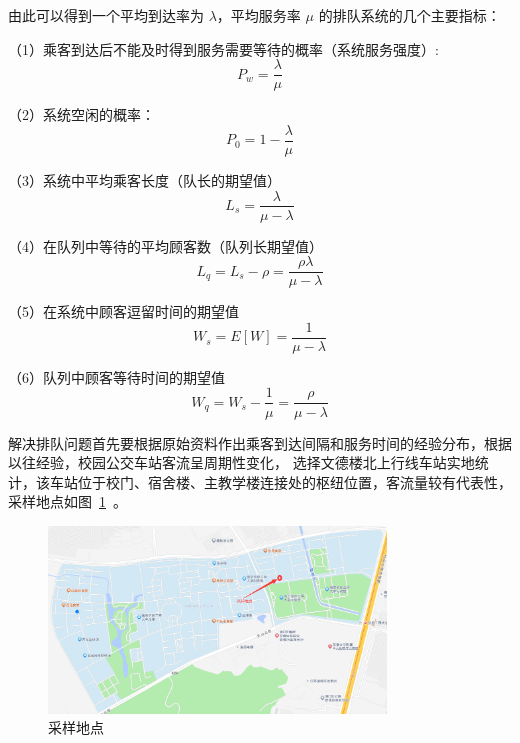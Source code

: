 由此可以得到一个平均到达率为 $\lambda$，平均服务率 $\mu$ 的排队系统的几个主要指标：

（1）乘客到达后不能及时得到服务需要等待的概率（系统服务强度）:
$$P_w = \frac{\lambda}{\mu}$$

（2）系统空闲的概率：
$$P_0 = 1-\frac{\lambda}{\mu}$$

（3）系统中平均乘客长度（队长的期望值）
$$L_s = \frac{\lambda}{\mu - \lambda}$$

（4）在队列中等待的平均顾客数（队列长期望值）
$$L_q = L_s - \rho = \frac{\rho \lambda}{\mu - \lambda}$$

（5）在系统中顾客逗留时间的期望值
$$W_s = E[W] = \frac{1}{\mu - \lambda}$$

（6）队列中顾客等待时间的期望值
$$W_q = W_s - \frac{1}{\mu} = \frac{\rho}{\mu - \lambda}$$


解决排队问题首先要根据原始资料作出乘客到达间隔和服务时间的经验分布，根据以往经验，校园公交车站客流呈周期性变化，
选择文德楼北上行线车站实地统计，该车站位于校门、宿舍楼、主教学楼连接处的枢纽位置，客流量较有代表性，采样地点如图~\ref{fig31}~。
\begin{figure}[htbp!]
    \centering
    \includegraphics[width=0.80\textwidth]{figs/chap03/map.png}
    \caption{采样地点}
    \label{fig31}
\end{figure}

